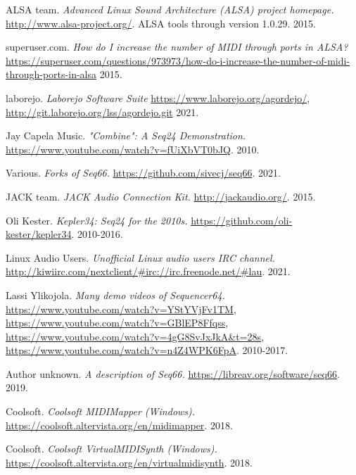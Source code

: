 {\RaggedRight
\begin{thebibliography}{99}

   ALSA team.
   \emph{Advanced Linux Sound Architecture (ALSA) project homepage.}
   \url{http://www.alsa-project.org/}.
   ALSA tools through version 1.0.29.
   2015.

   superuser.com.
   \emph{How do I increase the number of MIDI through ports in ALSA?}
   \url{https://superuser.com/questions/973973/how-do-i-increase-the-number-of-midi-through-ports-in-alsa}
   2015.

   laborejo.
   \emph{Laborejo Software Suite}
   \url{https://www.laborejo.org/agordejo/},
   \url{http://git.laborejo.org/lss/agordejo.git}
   2021.

   Jay Capela Music.
   \emph{"Combine": A Seq24 Demonstration.}
   \url{https://www.youtube.com/watch?v=fUiXbVT0bJQ}.
   2010.

   Various.
   \emph{Forks of Seq66.}
   \url{https://github.com/sivecj/seq66}.
   2021.

   JACK team.
   \emph{JACK Audio Connection Kit.}
   \url{http://jackaudio.org/}.
   2015.

   Oli Kester.
   \emph{Kepler34: Seq24 for the 2010s.}
   \url{https://github.com/oli-kester/kepler34}.
   2010-2016.

   Linux Audio Users.
   \emph{Unofficial Linux audio users IRC channel.}
   \url{http://kiwiirc.com/nextclient/#irc://irc.freenode.net/#lau}.
   2021.

   Lassi Ylikojola.
   \emph{Many demo videos of Sequencer64.}
   \url{https://www.youtube.com/watch?v=YStYVjFv1TM},
   \url{https://www.youtube.com/watch?v=GBlEP8Ffqss},
   \url{https://www.youtube.com/watch?v=4gG8SvJxJkA&t=28s},
   \url{https://www.youtube.com/watch?v=n4Z4WPK6FpA}.
   2010-2017.

   Author unknown.
   \emph{A description of Seq66.}
   \url{https://libreav.org/software/seq66}.
   2019.

   Coolsoft.
   \emph{Coolsoft MIDIMapper (Windows).}
   \url{https://coolsoft.altervista.org/en/midimapper}.
   2018.

   Coolsoft.
   \emph{Coolsoft VirtualMIDISynth (Windows).}
   \url{https://coolsoft.altervista.org/en/virtualmidisynth}.
   2018.


\end{thebibliography}}
